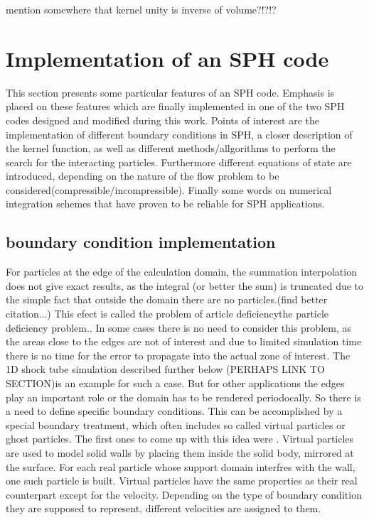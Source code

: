 \documentclass{report}
\begin{document}
 
mention somewhere that kernel unity is inverse of volume?!?!?

\section{Implementation of an SPH code}
This section presents some particular features of an SPH code. Emphasis is
placed on these features which are finally implemented in one of the
two SPH codes designed and modified during this work.
Points of interest are the implementation of different boundary conditions in
SPH, a closer description of the kernel function, as well as different methods/allgorithms
to perform the search for the interacting particles. Furthermore different
equations of state are introduced, depending on the nature of the flow problem
to be considered(compressible/incompressible). Finally some words on numerical
integration schemes that have proven to be reliable for SPH applications.


\subsection{boundary condition implementation}
For particles at the edge of the calculation domain, the summation interpolation does not
give exact results, as the integral (or better the sum) is truncated due to
the simple fact that outside the domain there are no
particles.\cite{Liu2003}(find better citation...) This efect is called the
problem of article deficiencythe particle deficiency
problem.\cite{Liu2003}. In some cases there is no need to consider this
problem, as the areas close to the edges are not of interest and due to
limited simulation time there is no time for the error to propagate into the
actual zone of interest. The 1D shock tube simulation described further below
(PERHAPS LINK TO SECTION)is an example for such a case.  
But for other applications the edges play an important role or the domain has
to be rendered periodocally. So there is a need to define specific boundary
conditions. This can be accomplished by a special boundary treatment, which
often includes so called virtual particles or ghost
particles\cite{Liu2003}. The first ones to come up with this idea were
\cite{LIBERSKY1993}. Virtual particles are used to model solid walls by
placing them inside the solid body, mirrored at the surface. For each real
particle whose support domain interfres with the wall, one such particle is
built. Virtual particles have the same properties as their real counterpart
except for the velocity. Depending on the type of boundary condition they are
supposed to represent, different velocities are assigned to them.\cite{Hu2006}
\end{document}
